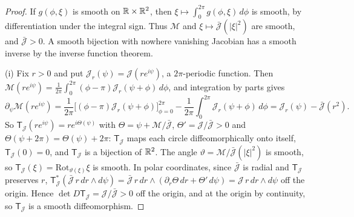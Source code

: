 \begin{proof}
If $g(\phi,\xi)$ is smooth on $\mathbb{R}\times\mathbb{R}^2$, then
$\xi\mapsto\int_0^{2\pi}g(\phi,\xi)\,d\phi$ is smooth, by differentiation under
the integral sign. Thus $\mathcal M$ and
$\xi\mapsto\bar{\mathcal J}(|\xi|^2)$ are smooth, and $\bar{\mathcal J}>0$.
A smooth bijection with nowhere vanishing Jacobian has a smooth inverse by the
inverse function theorem.

(i) Fix $r>0$ and put $\mathcal J_r(\psi)=\mathcal J(re^{i\psi})$, a $2\pi$-periodic function. Then
$\mathcal M(re^{i\psi})=\frac1{2\pi}\int_0^{2\pi}(\phi-\pi)\mathcal J_r(\psi+\phi)\,d\phi$, and integration by parts gives
\[
 \partial_\psi\mathcal M(re^{i\psi})=\frac1{2\pi}\Big[(\phi-\pi)\mathcal J_r(\psi+\phi)\Big]_{\phi=0}^{2\pi}
 -\frac1{2\pi}\int_0^{2\pi}\mathcal J_r(\psi+\phi)\,d\phi
 =\mathcal J_r(\psi)-\bar{\mathcal J}(r^2).
\]
So $\mathsf T_{\mathcal J}(re^{i\psi})=re^{i\Theta(\psi)}$ with $\Theta=\psi+\mathcal M/\bar{\mathcal J}$,
$\Theta'=\mathcal J/\bar{\mathcal J}>0$ and $\Theta(\psi+2\pi)=\Theta(\psi)+2\pi$: $\mathsf T_{\mathcal J}$ maps each circle
diffeomorphically onto itself, $\mathsf T_{\mathcal J}(0)=0$, and $\mathsf T_{\mathcal J}$ is a bijection of $\mathbb{R}^2$. The angle
$\vartheta=\mathcal M/\bar{\mathcal J}(|\xi|^2)$ is smooth, so $\mathsf T_{\mathcal J}(\xi)=\mathrm{Rot}_{\vartheta(\xi)}\xi$ is
smooth. In polar coordinates, since $\bar{\mathcal J}$ is radial and $\mathsf T_{\mathcal J}$ preserves $r$,
$\mathsf T_{\mathcal J}^*(\bar{\mathcal J}\,r\,dr\wedge d\psi)=\bar{\mathcal J}\,r\,dr\wedge(\partial_r\Theta\,dr+\Theta'\,d\psi)
=\mathcal J\,r\,dr\wedge d\psi$ off the origin. Hence $\det D\mathsf T_{\mathcal J}=\mathcal J/\bar{\mathcal J}>0$ off the origin, and at
the origin by continuity, so $\mathsf T_{\mathcal J}$ is a smooth diffeomorphism.


\end{proof}

